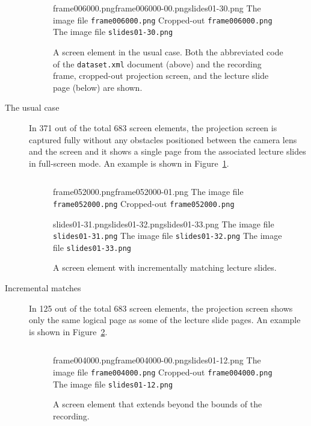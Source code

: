 \begin{description}
  \begin{figure}
    \inputminted{xml}{fig/examples/normal/example.xml}\par
      {frame006000.png}{frame006000-00.png}{slides01-30.png}%
      {The image file \texttt{frame006000.png}}%
      {Cropped-out \texttt{frame006000.png}}%
      {The image file \texttt{slides01-30.png}}
    \caption{A screen element in the usual case. Both the abbreviated code
      of the \texttt{dataset.xml} document (above) and the recording frame,
      cropped-out projection screen, and the lecture slide page (below) are
      shown.}
    \label{fig:example-normal}
  \end{figure}
  \item[The usual case] In 371 out of the total 683 screen elements, the
    projection screen is captured fully without any obstacles positioned
    between the camera lens and the screen and it shows a single page from the
    associated lecture slides in full-screen mode. An example is shown in
    Figure~\ref{fig:example-normal}.

  \begin{figure}
    \inputminted{xml}{fig/examples/incremental/example.xml}\par
      {frame052000.png}{frame052000-01.png}%
      {The image file \texttt{frame052000.png}}%
      {Cropped-out \texttt{frame052000.png}}\par
      {slides01-31.png}{slides01-32.png}{slides01-33.png}%
      {The image file \texttt{slides01-31.png}}%
      {The image file \texttt{slides01-32.png}}%
      {The image file \texttt{slides01-33.png}}
    \caption{A screen element with incrementally matching lecture slides.}
    \label{fig:example-incremental}
  \end{figure}
  \item[Incremental matches] In 125 out of the total 683 screen elements,
    the projection screen shows only the same logical page as some of the
    lecture slide pages. An example is shown in
    Figure~\ref{fig:example-incremental}.

  \begin{figure}
    \inputminted{xml}{fig/examples/beyond-bounds/example.xml}\par
      {frame004000.png}{frame004000-00.png}{slides01-12.png}%
      {The image file \texttt{frame004000.png}}%
      {Cropped-out \texttt{frame004000.png}}%
      {The image file \texttt{slides01-12.png}}
    \caption{A screen element that extends beyond the bounds of the recording.}
    \label{fig:example-beyond-bounds}


\end{figure}
\end{description}
